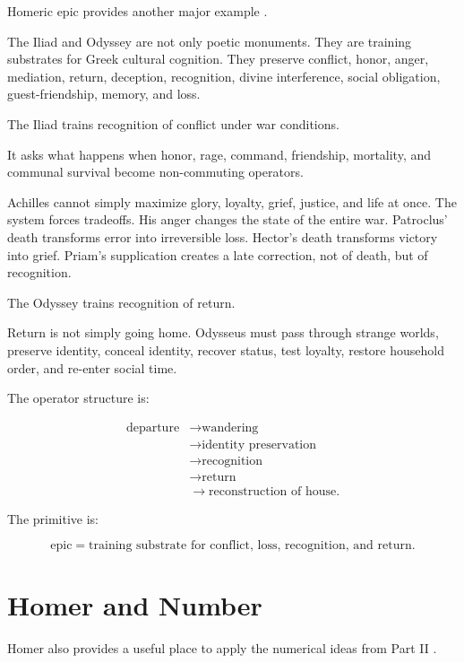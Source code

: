 \documentclass[11pt]{book}
\begin{document}
Homeric epic provides another major example \cite{HomerFagles1990Iliad,HomerFagles1996Odyssey,Nagy1979BestAchaeans}.

The Iliad and Odyssey are not only poetic monuments. They are training substrates for Greek cultural cognition. They preserve conflict, honor, anger, mediation, return, deception, recognition, divine interference, social obligation, guest-friendship, memory, and loss.

The Iliad trains recognition of conflict under war conditions.

It asks what happens when honor, rage, command, friendship, mortality, and communal survival become non-commuting operators.

Achilles cannot simply maximize glory, loyalty, grief, justice, and life at once. The system forces tradeoffs. His anger changes the state of the entire war. Patroclus' death transforms error into irreversible loss. Hector's death transforms victory into grief. Priam's supplication creates a late correction, not of death, but of recognition.

The Odyssey trains recognition of return.

Return is not simply going home. Odysseus must pass through strange worlds, preserve identity, conceal identity, recover status, test loyalty, restore household order, and re-enter social time.

The operator structure is:

\[
\begin{aligned}
\text{departure}
&\rightarrow
\text{wandering} \\
&\rightarrow
\text{identity preservation} \\
&\rightarrow
\text{recognition} \\
&\rightarrow
\text{return} \\
&\rightarrow
\text{reconstruction of house}.
\end{aligned}
\]

The primitive is:

\[
\text{epic} = \text{training substrate for conflict, loss, recognition, and return}.
\]

\section{Homer and Number}

Homer also provides a useful place to apply the numerical ideas from Part II \cite{HomerFagles1990Iliad,HomerFagles1996Odyssey,Nagy1979BestAchaeans}.
\end{document}
